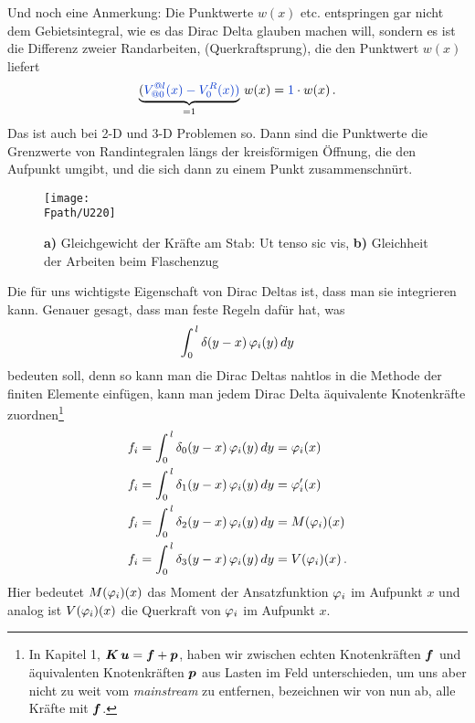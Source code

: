 Und noch eine Anmerkung: Die Punkt\-werte $w(x)$ etc. entspringen gar nicht dem Gebietsintegral, wie es das Dirac Delta glauben machen will, sondern es ist die Differenz zweier Randarbeiten, (Querkraftsprung), die den Punkt\-wert $w(x) $ liefert
\begin{align}
 \underbrace{(\textcolor{chapterTitleBlue}{V_{@0}^{@l}(x) - V_0^R(x))}}_{= 1}\,w(x) = \textcolor{chapterTitleBlue}{1}\cdot w(x)\,.
\end{align}
Das ist auch bei 2-D und 3-D Problemen so. Dann sind die Punktwerte die Grenzwerte von Randintegralen l\"{a}ngs der kreisf\"{o}rmigen \"{O}ffnung, die den Aufpunkt umgibt, und die sich dann zu einem Punkt zusammenschn\"{u}rt.

\begin{figure}[tbp]
\centering
\if {} \sidecaption \fi
\texttt{[image: \\Fpath/U220]}
\caption{\textbf{ a)} Gleichgewicht der Kr\"{a}fte am Stab: Ut tenso sic vis, \textbf{ b)} Gleichheit der Arbeiten beim Flaschenzug} \label{U220}
\end{figure}%

Die f\"{u}r uns wichtigste Eigenschaft von Dirac Deltas ist, dass man sie integrieren kann. Genauer gesagt, dass man feste Regeln daf\"{u}r hat, was
\begin{align}
\int_0^{\,l} \delta(y-x)\,\varphi_i(y)\,dy
\end{align}
bedeuten soll, denn so kann man die Dirac Deltas nahtlos in die Methode der finiten Elemente einf\"{u}gen, kann man jedem Dirac Delta \"{a}quivalente Knotenkr\"{a}fte zuordnen\footnote{In Kapitel 1, $\mbox{\boldmath $K$}\,\mbox{\boldmath $u$} = \mbox{\boldmath $f$} + \mbox{\boldmath $p$}$, haben wir zwischen echten Knotenkr\"{a}ften $\mbox{\boldmath $f$} $ und \"{a}quivalenten Knotenkr\"{a}ften $\mbox{\boldmath $p$}$ aus Lasten im Feld unterschieden, um uns aber nicht zu weit vom {\em mainstream\/} zu entfernen, bezeichnen wir von nun ab, alle Kr\"{a}fte mit $\mbox{\boldmath $f$} $.}
\begin{subequations}
\begin{align}
f_i &= \int_0^{\,l} \delta_0(y-x)\,\varphi_i(y)\,dy = \varphi_i(x) \\
f_i &= \int_0^{\,l} \delta_1(y-x)\,\varphi_i(y)\,dy = \varphi_i'(x)\\
f_i &= \int_0^{\,l} \delta_2(y-x)\,\varphi_i(y)\,dy = M(\varphi_i)(x) \\
f_i &= \int_0^{\,l} \delta_3(y-x)\,\varphi_i(y)\,dy = V(\varphi_i)(x)\,.
\end{align}
\end{subequations}
Hier bedeutet $M(\varphi_i)(x)$ das Moment der Ansatzfunktion $\varphi_i$ im Aufpunkt $x$ und analog ist $ V(\varphi_i)(x)$ die Querkraft von $\varphi_i$ im Aufpunkt $x$.

